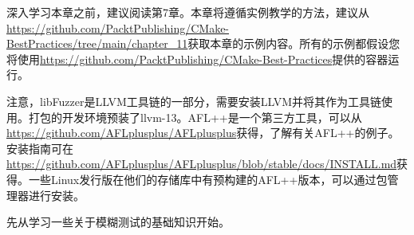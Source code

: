 深入学习本章之前，建议阅读第7章。本章将遵循实例教学的方法，建议从\url{https://github.com/PacktPublishing/CMake-BestPractices/tree/main/chapter\_11}获取本章的示例内容。所有的示例都假设您将使用\url{https://github.com/PacktPublishing/CMake-Best-Practices}提供的容器运行。

注意，libFuzzer是LLVM工具链的一部分，需要安装LLVM并将其作为工具链使用。打包的开发环境预装了llvm-13。AFL++是一个第三方工具，可以从\url{https://github.com/AFLplusplus/AFLplusplus}获得，了解有关AFL++的例子。安装指南可在\url{https://github.com/AFLplusplus/AFLplusplus/blob/stable/docs/INSTALL.md}获得。一些Linux发行版在他们的存储库中有预构建的AFL++版本，可以通过包管理器进行安装。

先从学习一些关于模糊测试的基础知识开始。
